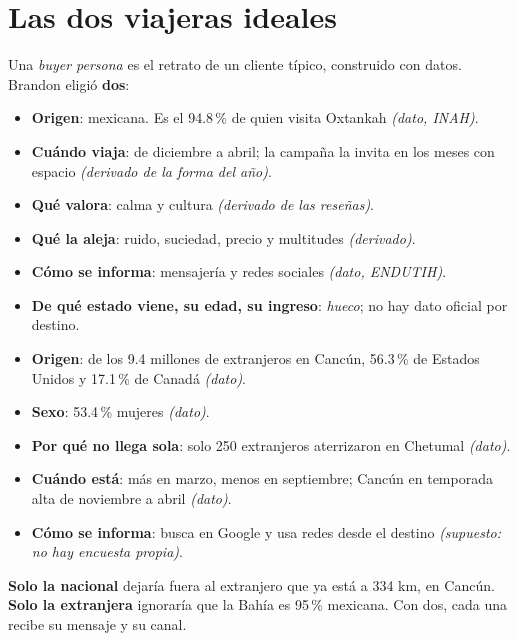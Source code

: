 \section{Las dos viajeras ideales}
Una \emph{buyer persona} es el retrato de un cliente típico, construido con datos. Brandon eligió \textbf{dos}:

\begin{opciones}
\begin{itemize}
\item \textbf{Origen}: mexicana. Es el 94.8\,\% de quien visita Oxtankah \emph{(dato, INAH)}.
\item \textbf{Cuándo viaja}: de diciembre a abril; la campaña la invita en los meses con espacio \emph{(derivado de la forma
  del año)}.
\item \textbf{Qué valora}: calma y cultura \emph{(derivado de las reseñas)}.
\item \textbf{Qué la aleja}: ruido, suciedad, precio y multitudes \emph{(derivado)}.
\item \textbf{Cómo se informa}: mensajería y redes sociales \emph{(dato, ENDUTIH)}.
\item \textbf{De qué estado viene, su edad, su ingreso}: \emph{hueco}; no hay dato oficial por destino.
\end{itemize}
\end{opciones}

\begin{opciones}
\begin{itemize}
\item \textbf{Origen}: de los 9.4 millones de extranjeros en Cancún, 56.3\,\% de Estados Unidos y 17.1\,\% de Canadá
  \emph{(dato)}.
\item \textbf{Sexo}: 53.4\,\% mujeres \emph{(dato)}.
\item \textbf{Por qué no llega sola}: solo 250 extranjeros aterrizaron en Chetumal \emph{(dato)}.
\item \textbf{Cuándo está}: más en marzo, menos en septiembre; Cancún en temporada alta de noviembre a abril \emph{(dato)}.
\item \textbf{Cómo se informa}: busca en Google y usa redes desde el destino \emph{(supuesto: no hay encuesta propia)}.
\end{itemize}
\end{opciones}

\begin{porque}
\textbf{Solo la nacional} dejaría fuera al extranjero que ya está a 334 km, en Cancún. \textbf{Solo la extranjera} ignoraría
que la Bahía es 95\,\% mexicana. Con dos, cada una recibe su mensaje y su canal.
\end{porque}

